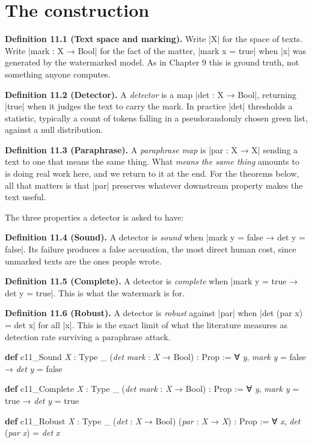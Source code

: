 \documentclass{memoir}
\begin{document}
\section{The construction}\label{Two--Schemas--of--Impossibility-005F-005F-005F--Machine--Checked--Limits--of--Trustworthy--Machine--Learning-005F-005F-005F--and--Why--They--Tighten--with--Capability----Watermarks-005F-005F-005F--Paraphrase-005F-005F-005F--and--the--Third--Corner----The--construction}

\textbf{Definition 11.1 (Text space and marking).} Write \LeanVerb|X| for the space of
texts. Write \LeanVerb|mark : X → Bool| for the fact of the matter, \LeanVerb|mark x = true| when
\LeanVerb|x| was generated by the watermarked model. As in Chapter 9 this is ground
truth, not something anyone computes.

\textbf{Definition 11.2 (Detector).} A \emph{detector} is a map
\LeanVerb|det : X → Bool|, returning \LeanVerb|true| when it judges the text to carry the mark. In
practice \LeanVerb|det| thresholds a statistic, typically a count of tokens falling in a
pseudorandomly chosen green list, against a null distribution.

\textbf{Definition 11.3 (Paraphrase).} A \emph{paraphrase map} is \LeanVerb|par : X → X| sending a text to
one that means the same thing. What \emph{means the same thing} amounts to is doing
real work here, and we return to it at the end. For the theorems below, all that
matters is that \LeanVerb|par| preserves whatever downstream property makes the text
useful.

The three properties a detector is asked to have:

\textbf{Definition 11.4 (Sound).} A detector is \emph{sound} when \LeanVerb|mark y = false → det y = false|.
Its failure produces a false accusation, the most direct human cost, since
unmarked texts are the ones people wrote.

\textbf{Definition 11.5 (Complete).} A detector is \emph{complete} when
\LeanVerb|mark y = true → det y = true|. This is what the watermark is for.

\textbf{Definition 11.6 (Robust).} A detector is \emph{robust} against \LeanVerb|par| when
\LeanVerb|det (par x) = det x| for all \LeanVerb|x|. This is the exact limit of what the
literature measures as detection rate surviving a paraphrase attack.

\begin{LeanVerbatim}
\textbf{def} c11_Sound \textit{X} : Type _ (\textit{det} \textit{mark} : \textit{X} → Bool) : Prop :=
  ∀ \textit{y}, \textit{mark} \textit{y} = false → \textit{det} \textit{y} = false

\textbf{def} c11_Complete \textit{X} : Type _
    (\textit{det} \textit{mark} : \textit{X} → Bool) : Prop :=
  ∀ \textit{y}, \textit{mark} \textit{y} = true → \textit{det} \textit{y} = true

\textbf{def} c11_Robust \textit{X} : Type _ (\textit{det} : \textit{X} → Bool)
    (\textit{par} : \textit{X} → \textit{X}) : Prop :=
  ∀ \textit{x}, \textit{det} (\textit{par} \textit{x}) = \textit{det} \textit{x}

\end{LeanVerbatim}
\end{document}
